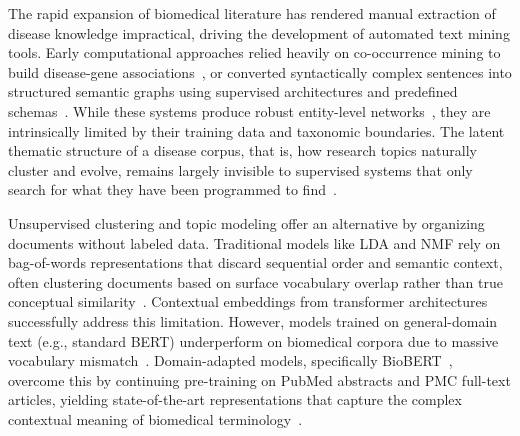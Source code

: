 \documentclass[a4paper,fleqn]{cas-dc}
\begin{document}
The rapid expansion of biomedical literature has rendered manual extraction of disease knowledge impractical, driving the development of automated text mining tools. Early computational approaches relied heavily on co-occurrence mining to build disease-gene associations~\cite{ref8}, or converted syntactically complex sentences into structured semantic graphs using supervised architectures and predefined schemas~\cite{ref12,ref13}. While these systems produce robust entity-level networks~\cite{ref9,ref10}, they are intrinsically limited by their training data and taxonomic boundaries. The latent thematic structure of a disease corpus, that is, how research topics naturally cluster and evolve, remains largely invisible to supervised systems that only search for what they have been programmed to find~\cite{ref14}.

Unsupervised clustering and topic modeling offer an alternative by organizing documents without labeled data. Traditional models like LDA and NMF rely on bag-of-words representations that discard sequential order and semantic context, often clustering documents based on surface vocabulary overlap rather than true conceptual similarity~\cite{ref15}. Contextual embeddings from transformer architectures successfully address this limitation. However, models trained on general-domain text (e.g., standard BERT) underperform on biomedical corpora due to massive vocabulary mismatch~\cite{ref2,ref17}. Domain-adapted models, specifically BioBERT~\cite{ref1}, overcome this by continuing pre-training on PubMed abstracts and PMC full-text articles, yielding state-of-the-art representations that capture the complex contextual meaning of biomedical terminology~\cite{ref3,ref4,ref5,ref6,ref7}. 
\end{document}
